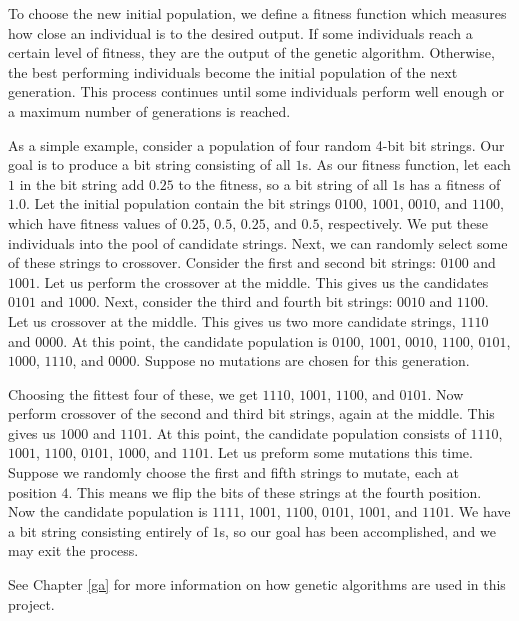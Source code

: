 To choose the new initial population, we define a fitness function which measures how close an individual is to the desired output.
If some individuals reach a certain level of fitness, they are the output of the genetic algorithm.
Otherwise, the best performing individuals become the initial population of the next generation.
This process continues until some individuals perform well enough or a maximum number of generations is reached.

As a simple example, consider a population of four random 4-bit bit strings.
Our goal is to produce a bit string consisting of all $1$s.
As our fitness function, let each $1$ in the bit string add $0.25$ to the fitness, so a bit string of all $1$s has a fitness of $1.0$.
Let the initial population contain the bit strings $0100$, $1001$, $0010$, and $1100$, which have fitness values of $0.25$, $0.5$, $0.25$, and $0.5$, respectively.
We put these individuals into the pool of candidate strings.
Next, we can randomly select some of these strings to crossover.
Consider the first and second bit strings: $0100$ and $1001$.
Let us perform the crossover at the middle.
This gives us the candidates $0101$ and $1000$.
Next, consider the third and fourth bit strings: $0010$ and $1100$. Let us crossover at the middle.
This gives us two more candidate strings, $1110$ and $0000$.
At this point, the candidate population is $0100$, $1001$, $0010$, $1100$, $0101$, $1000$, $1110$, and $0000$.
Suppose no mutations are chosen for this generation.

Choosing the fittest four of these, we get $1110$, $1001$, $1100$, and $0101$.
Now perform crossover of the second and third bit strings, again at the middle.
This gives us $1000$ and $1101$.
At this point, the candidate population consists of $1110$, $1001$, $1100$, $0101$, $1000$, and $1101$.
Let us preform some mutations this time.
Suppose we randomly choose the first and fifth strings to mutate, each at position $4$.
This means we flip the bits of these strings at the fourth position.
Now the candidate population is $1111$, $1001$, $1100$, $0101$, $1001$, and $1101$.
We have a bit string consisting entirely of $1$s, so our goal has been accomplished, and we may exit the process.

See Chapter \ref{ga} for more information on how genetic algorithms are used in this project.
